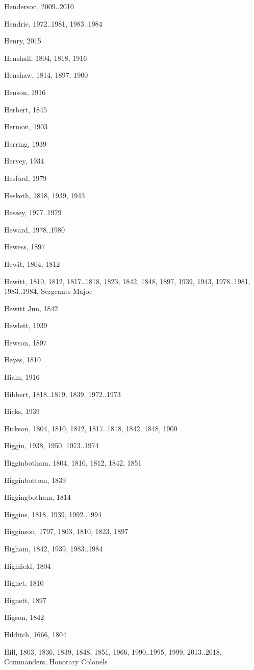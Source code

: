 {\begin{theindex}
\item Henderson, 2009..2010
\item Hendrie, 1972..1981, 1983..1984
\item Henry, 2015
\item Henshall, 1804, 1818, 1916
\item Henshaw, 1814, 1897, 1900
\item Henson, 1916
\item Herbert, 1845
\item Hermon, 1903
\item Herring, 1939
\item Hervey, 1934
\item Hesford, 1979
\item Hesketh, 1818, 1939, 1943
\item Hessey, 1977..1979
\item Heward, 1978..1980
\item Hewess, 1897
\item Hewit, 1804, 1812
\item Hewitt, 1810, 1812, 1817..1818, 1823, 1842, 1848, 1897, 1939, 1943, 1978..1981, 1983..1984, Sergeants Major
\item Hewitt Jun, 1842
\item Hewlett, 1939
\item Hewson, 1897
\item Heyes, 1810
\item Hiam, 1916
\item Hibbert, 1818..1819, 1839, 1972..1973
\item Hicks, 1939
\item Hickson, 1804, 1810, 1812, 1817..1818, 1842, 1848, 1900
\item Higgin, 1938, 1950, 1973..1974
\item Higginbotham, 1804, 1810, 1812, 1842, 1851
\item Higginbottom, 1839
\item Higgingbotham, 1814
\item Higgins, 1818, 1939, 1992..1994
\item Higginson, 1797, 1803, 1810, 1823, 1897
\item Higham, 1842, 1939, 1983..1984
\item Highfield, 1804
\item Hignet, 1810
\item Hignett, 1897
\item Higson, 1842
\item Hilditch, 1666, 1804
\item Hill, 1803, 1836, 1839, 1848, 1851, 1966, 1990..1995, 1999, 2013..2018, Commanders, Honorary Colonels

\end{theindex}}
